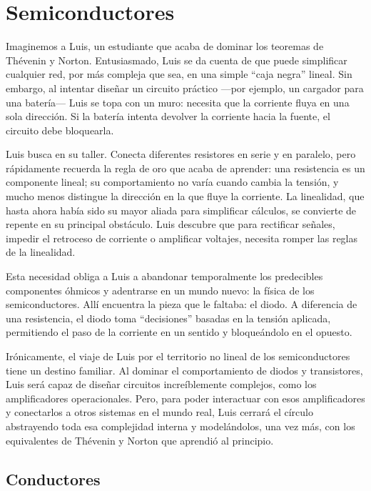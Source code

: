 \section{Semiconductores}

Imaginemos a Luis, un estudiante que acaba de dominar los teoremas de Thévenin y Norton. Entusiasmado, Luis se da cuenta de que puede simplificar cualquier red, por más compleja que sea, en una simple ``caja negra'' lineal. Sin embargo, al intentar diseñar un circuito práctico —por ejemplo, un cargador para una batería— Luis se topa con un muro: necesita que la corriente fluya en una sola dirección. Si la batería intenta devolver la corriente hacia la fuente, el circuito debe bloquearla.

Luis busca en su taller. Conecta diferentes resistores en serie y en paralelo, pero rápidamente recuerda la regla de oro que acaba de aprender: una resistencia es un componente lineal; su comportamiento no varía cuando cambia la tensión, y mucho menos distingue la dirección en la que fluye la corriente. La linealidad, que hasta ahora había sido su mayor aliada para simplificar cálculos, se convierte de repente en su principal obstáculo. Luis descubre que para rectificar señales, impedir el retroceso de corriente o amplificar voltajes, necesita romper las reglas de la linealidad.

Esta necesidad obliga a Luis a abandonar temporalmente los predecibles componentes óhmicos y adentrarse en un mundo nuevo: la física de los semiconductores. Allí encuentra la pieza que le faltaba: el diodo. A diferencia de una resistencia, el diodo toma ``decisiones'' basadas en la tensión aplicada, permitiendo el paso de la corriente en un sentido y bloqueándolo en el opuesto.

Irónicamente, el viaje de Luis por el territorio no lineal de los semiconductores tiene un destino familiar. Al dominar el comportamiento de diodos y transistores, Luis será capaz de diseñar circuitos increíblemente complejos, como los amplificadores operacionales. Pero, para poder interactuar con esos amplificadores y conectarlos a otros sistemas en el mundo real, Luis cerrará el círculo abstrayendo toda esa complejidad interna y modelándolos, una vez más, con los equivalentes de Thévenin y Norton que aprendió al principio.

\subsection{Conductores}

